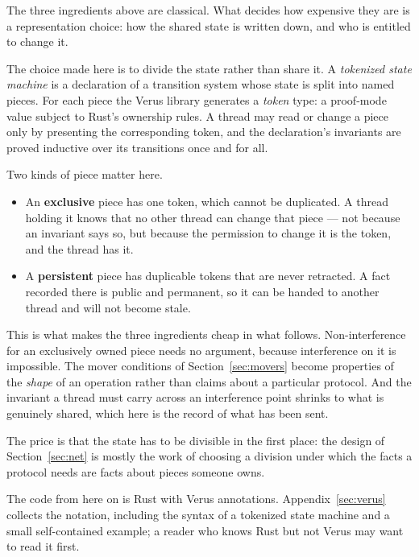 \documentclass[11pt]{article}
\begin{document}
The three ingredients above are classical. What decides how expensive they are
is a representation choice: how the shared state is written down, and who is
entitled to change it.

The choice made here is to divide the state rather than share it. A
\emph{tokenized state machine} is a declaration of a transition system whose
state is split into named pieces. For each piece the Verus library generates a
\emph{token} type: a proof-mode value subject to Rust's ownership rules. A
thread may read or change a piece only by presenting the corresponding token,
and the declaration's invariants are proved inductive over its transitions once
and for all.

Two kinds of piece matter here.

\begin{itemize}[leftmargin=1.2em,itemsep=3pt,topsep=3pt]
\item An \textbf{exclusive} piece has one token, which cannot be duplicated. A
  thread holding it knows that no other thread can change that piece --- not
  because an invariant says so, but because the permission to change it is the
  token, and the thread has it.
\item A \textbf{persistent} piece has duplicable tokens that are never
  retracted. A fact recorded there is public and permanent, so it can be handed
  to another thread and will not become stale.
\end{itemize}

This is what makes the three ingredients cheap in what follows.
Non-interference for an exclusively owned piece needs no argument, because
interference on it is impossible. The mover conditions of
Section~\ref{sec:movers} become properties of the \emph{shape} of an operation
rather than claims about a particular protocol. And the invariant a thread must
carry across an interference point shrinks to what is genuinely shared, which
here is the record of what has been sent.

The price is that the state has to be divisible in the first place: the design
of Section~\ref{sec:net} is mostly the work of choosing a division under which
the facts a protocol needs are facts about pieces someone owns.

The code from here on is Rust with Verus annotations.
Appendix~\ref{sec:verus} collects the notation, including the syntax of a
tokenized state machine and a small self-contained example; a reader who knows
Rust but not Verus may want to read it first.
\end{document}
